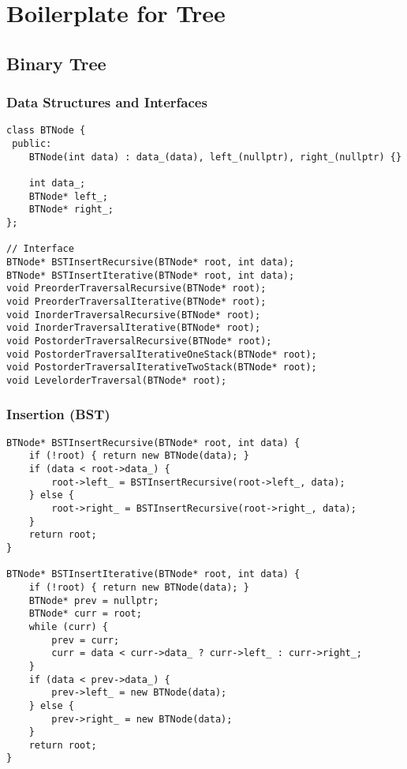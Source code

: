 \chapter{Boilerplate for Tree}
\section{Binary Tree}

\subsection{Data Structures and Interfaces}
\begin{lstlisting}
class BTNode {
 public:
	BTNode(int data) : data_(data), left_(nullptr), right_(nullptr) {}
	
	int data_;
	BTNode* left_;
	BTNode* right_;
};

// Interface
BTNode* BSTInsertRecursive(BTNode* root, int data);
BTNode* BSTInsertIterative(BTNode* root, int data);
void PreorderTraversalRecursive(BTNode* root);
void PreorderTraversalIterative(BTNode* root);
void InorderTraversalRecursive(BTNode* root);
void InorderTraversalIterative(BTNode* root);
void PostorderTraversalRecursive(BTNode* root);
void PostorderTraversalIterativeOneStack(BTNode* root);
void PostorderTraversalIterativeTwoStack(BTNode* root);
void LevelorderTraversal(BTNode* root);
\end{lstlisting}

\subsection{Insertion (BST)}
\begin{lstlisting}
BTNode* BSTInsertRecursive(BTNode* root, int data) {
	if (!root) { return new BTNode(data); }
	if (data < root->data_) {
		root->left_ = BSTInsertRecursive(root->left_, data);
	} else {
		root->right_ = BSTInsertRecursive(root->right_, data);
	}
	return root;
}

BTNode* BSTInsertIterative(BTNode* root, int data) {
	if (!root) { return new BTNode(data); }
	BTNode* prev = nullptr;
	BTNode* curr = root;
	while (curr) {
		prev = curr;
		curr = data < curr->data_ ? curr->left_ : curr->right_;
	}
	if (data < prev->data_) {
		prev->left_ = new BTNode(data);
	} else {
		prev->right_ = new BTNode(data);
	}
	return root;
}
\end{lstlisting}

